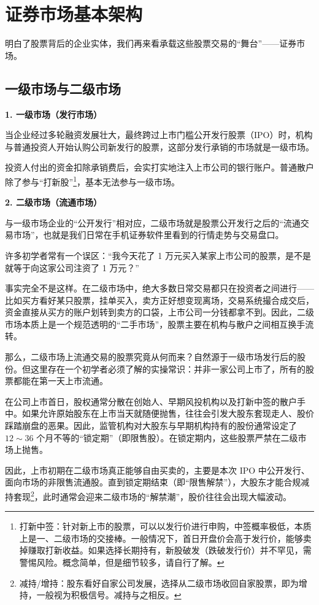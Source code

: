 \documentclass[12pt,openany]{book}
\newcommand{\subhead}[1]{%
    \par\vspace{0.5\baselineskip}%
    \noindent\textbf{#1}\par%
    \vspace{0.5\baselineskip}%
}
\begin{document}
\section{证券市场基本架构}

明白了股票背后的企业实体，我们再来看承载这些股票交易的“舞台”——证券市场。

\subsection{一级市场与二级市场}

\subhead{1. 一级市场（发行市场）}

当企业经过多轮融资发展壮大，最终跨过上市门槛公开发行股票（IPO）时，机构与普通投资人开始认购公司新发行的股票，这部分发行承销的市场就是一级市场。

投资人付出的资金扣除承销费后，会实打实地注入上市公司的银行账户。普通散户除了参与“打新股”\footnote{打新中签：针对新上市的股票，可以以发行价进行申购，中签概率极低，本质上是一、二级市场的交接棒。一般情况下，首日开盘价会高于发行价，能够卖掉赚取打新收益。如果选择长期持有，新股破发（跌破发行价）并不罕见，需警惕风险。概念简单，但是细节较多，请自行了解。}，基本无法参与一级市场。

\subhead{2. 二级市场（流通市场）}

与一级市场企业的“公开发行”相对应，二级市场就是股票公开发行之后的“流通交易市场”，也就是我们日常在手机证券软件里看到的行情走势与交易盘口。

许多初学者常有一个误区：“我今天花了 1 万元买入某家上市公司的股票，是不是就等于向这家公司注资了 1 万元？”

事实完全不是这样。在二级市场中，绝大多数日常交易都只在投资者之间进行——比如买方看好某只股票，挂单买入，卖方正好想变现离场，交易系统撮合成交后，资金直接从买方的账户划转到卖方的口袋，上市公司一分钱都拿不到。因此，二级市场本质上是一个规范透明的“二手市场”，股票主要在机构与散户之间相互换手流转。

那么，二级市场上流通交易的股票究竟从何而来？自然源于一级市场发行后的股份。但这里存在一个初学者必须了解的实操常识：并非一家公司上市了，所有的股票都能在第一天上市流通。

在公司上市首日，股权通常分散在创始人、早期风投机构以及打新中签的散户手中。如果允许原始股东在上市当天就随便抛售，往往会引发大股东套现走人、股价踩踏崩盘的恶果。因此，监管机构对大股东与早期机构持有的股份通常设定了 $12\sim 36$ 个月不等的“锁定期”（即限售股）。在锁定期内，这些股票严禁在二级市场上抛售。

因此，上市初期在二级市场真正能够自由买卖的，主要是本次 IPO 中公开发行、面向市场的非限售流通股。直到锁定期结束（即“限售解禁”），大股东才能合规减持套现\footnote{减持/增持：股东看好自家公司发展，选择从二级市场收回自家股票，即为增持，一般视为积极信号。减持与之相反。}，此时通常会迎来二级市场的“解禁潮”，股价往往会出现大幅波动。
\end{document}
